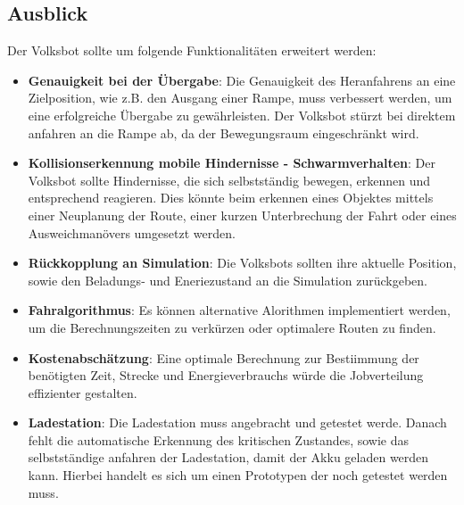 \subsection{Ausblick}

Der Volksbot sollte um folgende Funktionalitäten erweitert werden:

\begin{itemize}

\item \textbf{Genauigkeit bei der Übergabe}: Die Genauigkeit des Heranfahrens an eine Zielposition, wie z.B. den Ausgang einer Rampe, muss verbessert werden, um eine erfolgreiche Übergabe zu gewährleisten. Der Volksbot stürzt bei direktem anfahren an die Rampe ab, da der Bewegungsraum eingeschränkt wird.

\item \textbf{Kollisionserkennung mobile Hindernisse - Schwarmverhalten}: Der Volksbot sollte Hindernisse, die sich selbstständig bewegen, erkennen und entsprechend reagieren. Dies könnte beim erkennen eines Objektes mittels einer Neuplanung der Route, einer kurzen Unterbrechung der Fahrt oder eines Ausweichmanövers umgesetzt werden.

\item \textbf{Rückkopplung an Simulation}: Die Volksbots sollten ihre aktuelle Position, sowie den Beladungs- und Eneriezustand an die Simulation zurückgeben.

\item \textbf{Fahralgorithmus}: Es können alternative Alorithmen implementiert werden, um die Berechnungszeiten zu verkürzen oder optimalere Routen zu finden.

\item \textbf{Kostenabschätzung}: Eine optimale Berechnung zur Bestiimmung der benötigten Zeit, Strecke und Energieverbrauchs würde die Jobverteilung effizienter gestalten.

\item \textbf{Ladestation}: Die Ladestation muss angebracht und getestet werde. Danach fehlt die automatische Erkennung des kritischen Zustandes, sowie das selbstständige anfahren der Ladestation, damit der Akku geladen werden kann. Hierbei handelt es sich um einen Prototypen der noch getestet werden muss.

\end{itemize}



